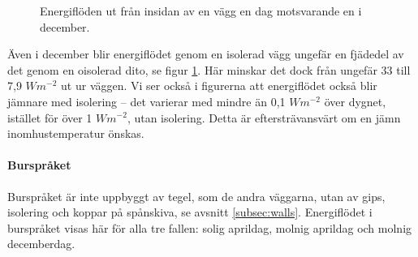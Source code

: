 \begin{figure}[hpbt]
\centering
{}\vspace{1cm}
\caption{\label{fig:wall_dec} Energiflöden ut från insidan av en vägg en dag motsvarande en i december.
}
\end{figure}

Även i december blir energiflödet genom en isolerad vägg ungefär en fjädedel av det 
genom en oisolerad dito, se figur \ref{fig:wall_dec}. Här minskar det dock från ungefär 33 
till 7,9 $\unit{W m^{-2}}$ ut ur väggen. Vi ser också i figurerna att energiflödet också blir 
jämnare med isolering – det varierar med mindre än 0,1 $\unit{W m^{-2}}$ över dygnet, 
istället för över 1 $\unit{W m^{-2}}$, utan isolering. Detta är eftersträvansvärt om en jämn inomhustemperatur önskas.


\paragraph{Burspråket}

Burspråket är inte uppbyggt av tegel, som de andra väggarna, utan av gips, isolering och koppar på spånskiva, se avsnitt \ref{subsec:walls}. Energiflödet i burspråket visas här för alla tre fallen: solig aprildag, molnig aprildag och molnig decemberdag.

